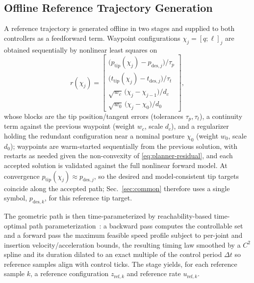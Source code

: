 \documentclass[journal]{IEEEtran}
\begin{document}
\subsection{Offline Reference Trajectory Generation}
\label{sec:planner}

A reference trajectory is generated offline in two stages and supplied to
both controllers as a feedforward term. Waypoint configurations
$\chi_j=[q;\ell]_j$ are obtained sequentially by nonlinear least squares
on
\begin{equation}
r(\chi_j) =
\begin{bmatrix}
\big(p_{\mathrm{tip}}(\chi_j)-p_{\mathrm{des},j}\big)/\tau_p\\[2pt]
\big(t_{\mathrm{tip}}(\chi_j)-t_{\mathrm{des},j}\big)/\tau_t\\[2pt]
\sqrt{w_c}\,\big(\chi_j-\chi_{j-1}\big)/d_c\\[2pt]
\sqrt{w_0}\,\big(\chi_j-\chi_0\big)/d_0
\end{bmatrix},
\label{eq:planner-residual}
\end{equation}
whose blocks are the tip position/tangent errors (tolerances
$\tau_p,\tau_t$), a continuity term against the previous waypoint (weight
$w_c$, scale $d_c$), and a regularizer holding the redundant configuration
near a nominal posture $\chi_0$ (weight $w_0$, scale $d_0$); waypoints are
warm-started sequentially from the previous solution, with restarts as
needed given the non-convexity of \eqref{eq:planner-residual}, and each
accepted solution is validated against the full nonlinear forward model.
At convergence $p_{\mathrm{tip}}(\chi_j)\approx p_{\mathrm{des},j}$, so the
desired and model-consistent tip targets coincide along the accepted
path; Sec.~\ref{sec:common} therefore uses a single symbol,
$p_{\mathrm{des},k}$, for this reference tip target.

The geometric path is then time-parameterized by reachability-based
time-optimal path
parameterization~\cite{bobrow1985timeoptimal,shinmckay1985minimumtime,phampham2018reachability}:
a backward pass computes the controllable set and a forward pass the
maximum feasible speed profile subject to per-joint and insertion
velocity/acceleration bounds, the resulting timing law smoothed by a
$C^2$ spline and its duration dilated to an exact multiple of the control
period $\Delta t$ so reference samples align with control ticks. The
stage yields, for each reference sample $k$, a reference configuration
$z_{\mathrm{ref},k}$ and reference rate $u_{\mathrm{ref},k}$.
\end{document}
